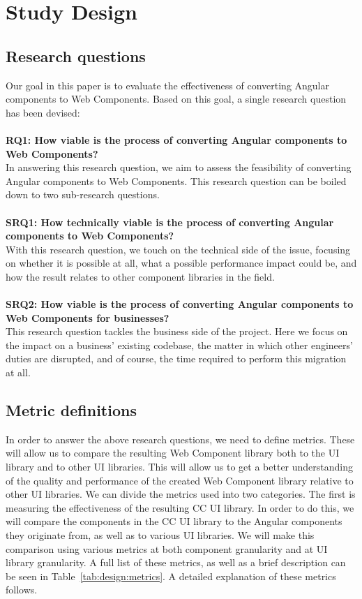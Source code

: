 \chapter{Study Design}\label{chap:design}

\section{Research questions}
Our goal in this paper is to evaluate the effectiveness of converting Angular components to Web Components. Based on this goal, a single research question has been devised:
\\
\\
\textbf{RQ1: How viable is the process of converting Angular components to Web Components?}
\\
In answering this research question, we aim to assess the feasibility of converting Angular components to Web Components. This research question can be boiled down to two sub-research questions.
\\
\\
\textbf{SRQ1: How technically viable is the process of converting Angular components to Web Components?}
\\
With this research question, we touch on the technical side of the issue, focusing on whether it is possible at all, what a possible performance impact could be, and how the result relates to other component libraries in the field.
\\
\\
\textbf{SRQ2: How viable is the process of converting Angular components to Web Components for businesses?}
\\
This research question tackles the business side of the project. Here we focus on the impact on a business' existing codebase, the matter in which other engineers' duties are disrupted, and of course, the time required to perform this migration at all.


\section{Metric definitions}
In order to answer the above research questions, we need to define metrics. These will allow us to compare the resulting Web Component library both to the UI library and to other UI libraries. This will allow us to get a better understanding of the quality and performance of the created Web Component library relative to other UI libraries. We can divide the metrics used into two categories. The first is measuring the effectiveness of the resulting CC UI library. In order to do this, we will compare the components in the CC UI library to the Angular components they originate from, as well as to various UI libraries. We will make this comparison using various metrics at both component granularity and at UI library granularity. A full list of these metrics, as well as a brief description can be seen in Table~\ref{tab:design:metrics}. A detailed explanation of these metrics follows.


